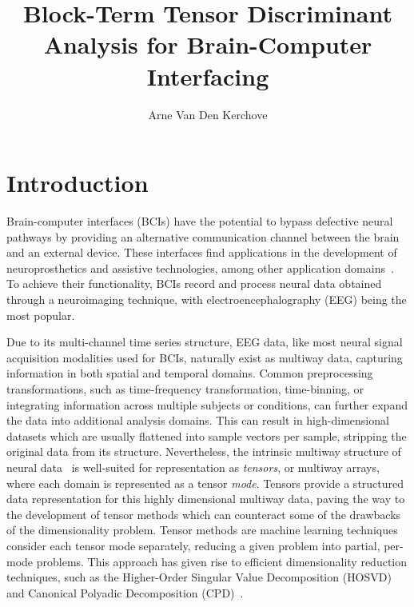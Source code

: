 \documentclass[twocolumn]{article}
\title{Block-Term Tensor Discriminant Analysis for Brain-Computer Interfacing}
\author{Arne Van Den Kerchove}
\begin{document}
\maketitle

\begin{abstract}
\end{abstract}

\section{Introduction}
Brain-computer interfaces (BCIs) have the potential to bypass
defective neural pathways by providing an alternative communication channel
between the brain and an external device.
These interfaces find applications in the development of neuroprosthetics and assistive
technologies, among other application domains~\cite{Wolpaw2020}.
To achieve their functionality, BCIs record and process neural data obtained through
a neuroimaging technique, with electroencephalography (EEG) being the most popular.

Due to its multi-channel time series structure, EEG data, like most neural
signal acquisition modalities used for BCIs, naturally exist as multiway data,
capturing information in both spatial and temporal domains.
Common preprocessing transformations, such as time-frequency transformation,
time-binning, or integrating information across multiple subjects or conditions,
can further expand the data into additional analysis domains.
This can result in high-dimensional datasets which are usually flattened into
	sample vectors per sample, stripping the original data from its structure.
Nevertheless, the intrinsic multiway structure of neural data~\cite{Erol2022} is
well-suited for representation as \emph{tensors}, or multiway arrays, where
each domain is represented as a tensor \emph{mode}.
Tensors provide a structured data representation for this highly dimensional
multiway data, paving the way to the development of tensor methods which can
counteract some of the drawbacks of the dimensionality problem.
Tensor methods are machine learning techniques  consider each tensor mode
separately, reducing a given problem into partial, per-mode problems.
This approach has given rise to efficient dimensionality reduction techniques,
such as the Higher-Order Singular Value Decomposition
(\textsc{HOSVD})~\cite{DeLathauwer2000,SoleCasals2018}
and Canonical Polyadic Decomposition
(\textsc{CPD})~\cite{Hitchcock1927,Nazarpour2006}.
\end{document}
